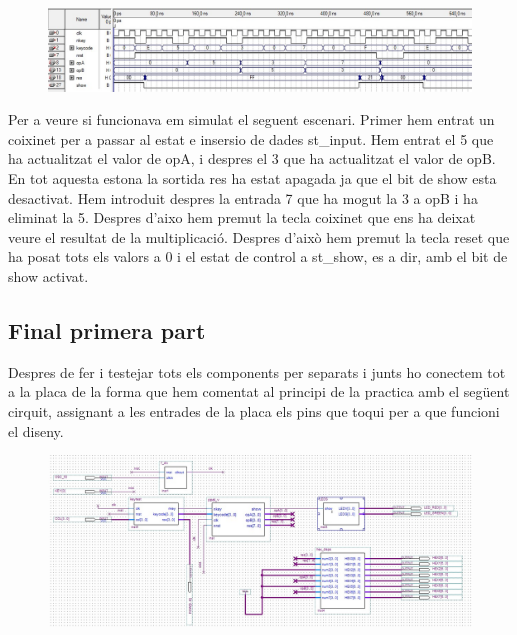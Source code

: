 \documentclass[12pt, a4papre]{article}
\begin{document}
	\begin{figure}[H]
		\begin{center}
		\includegraphics[width=130mm]{SimPpal.jpeg}
		\end{center}
	\end{figure}
	
	Per a veure si funcionava em simulat el seguent escenari. Primer hem entrat un coixinet per a passar al estat e insersio de dades st\_input. Hem entrat el 5 que ha actualitzat el valor de opA, i despres el 3 que ha actualitzat el valor de opB. En tot aquesta estona la sortida res ha estat apagada ja que el bit de show esta desactivat. Hem introduit despres la entrada 7 que ha mogut la 3 a opB i ha eliminat la 5. Despres d'aixo hem premut la tecla coixinet que ens ha deixat veure el resultat de la multiplicació. Despres d'això hem premut la tecla reset que ha posat tots els valors a 0 i el estat de control a st\_show, es a dir, amb el bit de show activat.
	
	\subsection{Final primera part}
	
	Despres de fer i testejar tots els components per separats i junts ho conectem tot a la placa de la forma que hem comentat al principi de la practica amb el següent cirquit, assignant a les entrades de la placa els pins que toqui per a que funcioni el diseny.
	
	\begin{figure}[H]
		\begin{center}
		\includegraphics[width=130mm]{FinalDiseny.jpeg}
		\end{center}
	\end{figure}
	
\end{document}

